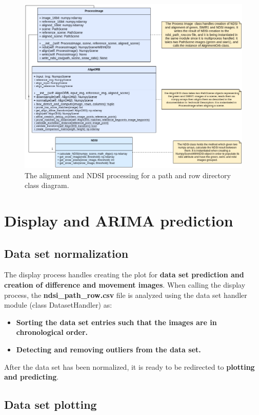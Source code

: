 \documentclass[12pt, a4paper]{report}
\begin{document}
	
	\begin{figure}[H]
		\centering
		\includegraphics[scale=2.1]{process_image_class.png}
		\caption{The alignment and NDSI processing for a path and row directory class diagram.}
		\label{fig:process_align_ndsi}
	\end{figure}

	\newpage{}
	
	\section{Display and ARIMA prediction}
	
	\subsection{Data set normalization}
	
	The display process handles creating the plot for \textbf{data set prediction and creation of difference and movement images}. When calling the display process, the \textbf{ndsi\_path\_row.csv} file is analyzed using the data set handler module (class DatasetHandler) as:
	\begin{itemize}
		\item \textbf{Sorting the data set entries such that the images are in chronological order.}
		\item \textbf{Detecting and removing outliers from the data set.}
	\end{itemize}
	After the data set has been normalized, it is ready to be redirected to \textbf{plotting and predicting}.
	
	\subsection{Data set plotting}
	
\end{document}
